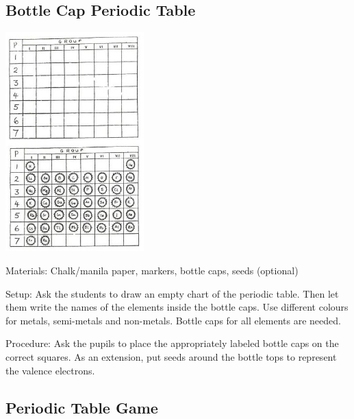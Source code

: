 \begin{multicols}{2}
\subsection{Bottle Cap Periodic Table}

\begin{center}
\includegraphics[width=0.4\textwidth]{./img/source/periodic-table.jpg}
\end{center}

\begin{description*}
\item[Materials:]{Chalk/manila paper, markers, bottle caps, seeds (optional)}
\item[Setup:]{Ask the students to draw an empty chart
of the periodic table. Then let them write the names of the
elements inside the bottle caps.
Use different colours for metals, semi-metals
and non-metals. Bottle caps for all elements are
needed.}
\item[Procedure:]{Ask the pupils
to place the appropriately labeled bottle caps on
the correct squares. As an extension, put seeds around
the bottle tops to represent the valence electrons.}
\end{description*}

\subsection{Periodic Table Game}


\end{multicols}
